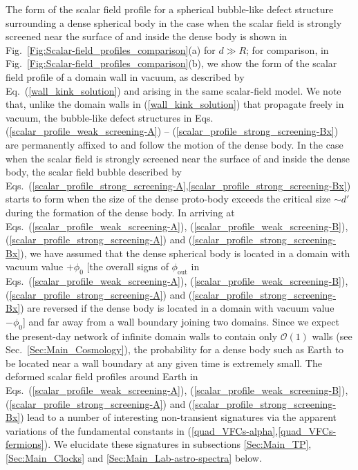 \documentclass[aps,prd,onecolumn,nofootinbib]{revtex4-2} %
\begin{document}
The form of the scalar field profile for a spherical bubble-like defect structure surrounding a dense spherical body in the case when the scalar field is strongly screened near the surface of and inside the dense body is shown in Fig.~\ref{Fig:Scalar-field_profiles_comparison}(a) for $d \gg R$; 
for comparison, in Fig.~\ref{Fig:Scalar-field_profiles_comparison}(b), we show the form of the scalar field profile of a domain wall in vacuum, as described by Eq.~(\ref{wall_kink_solution}) and arising in the same scalar-field model. 
We note that, unlike the domain walls in (\ref{wall_kink_solution}) that propagate freely in vacuum, the bubble-like defect structures in Eqs. (\ref{scalar_profile_weak_screening-A}) -- (\ref{scalar_profile_strong_screening-Bx}) are permanently affixed to and follow the motion of the dense body. 
In the case when the scalar field is strongly screened near the surface of and inside the dense body, the scalar field bubble described by Eqs.~(\ref{scalar_profile_strong_screening-A},\ref{scalar_profile_strong_screening-Bx}) starts to form when the size of the dense proto-body exceeds the critical size $\sim d'$ during the formation of the dense body. 
In arriving at Eqs.~(\ref{scalar_profile_weak_screening-A}), (\ref{scalar_profile_weak_screening-B}), (\ref{scalar_profile_strong_screening-A}) and (\ref{scalar_profile_strong_screening-Bx}), we have assumed that the dense spherical body is located in a domain with vacuum value $+ \phi_0$ [the overall signs of $\phi_\textrm{out}$ in Eqs.~(\ref{scalar_profile_weak_screening-A}), (\ref{scalar_profile_weak_screening-B}), (\ref{scalar_profile_strong_screening-A}) and (\ref{scalar_profile_strong_screening-Bx}) are reversed if the dense body is located in a domain with vacuum value $-\phi_0$] and far away from a wall boundary joining two domains. 
Since we expect the present-day network of infinite domain walls to contain only $\mathcal{O}(1)$ walls (see Sec.~\ref{Sec:Main_Cosmology}), the probability for a dense body such as Earth to be located near a wall boundary at any given time is extremely small. 
The deformed scalar field profiles around Earth in Eqs.~(\ref{scalar_profile_weak_screening-A}), (\ref{scalar_profile_weak_screening-B}), (\ref{scalar_profile_strong_screening-A}) and (\ref{scalar_profile_strong_screening-Bx}) lead to a number of interesting non-transient signatures via the apparent variations of the fundamental constants in (\ref{quad_VFCs-alpha},\ref{quad_VFCs-fermions}). 
We elucidate these signatures in subsections \ref{Sec:Main_TP}, \ref{Sec:Main_Clocks} and \ref{Sec:Main_Lab-astro-spectra} below. 
\end{document}
